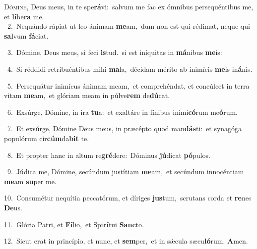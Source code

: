 \lettrine{\initial\textcolor{\initialcolor}{D}}{ómine,} Deus meus, in te spe\-\textbf{rá}\-vi:~\star salvum me fac ex ómnibus persequéntibus me, et \textbf{lí}\-be\textbf{ra} me.\\
{\numbfont\textcolor{\numbcolor}{~2.}}~Nequándo rápiat ut leo ánimam \textbf{me}\-am,~\star dum non est qui rédimat, neque qui \textbf{sal}\-vum \textbf{fá}\-ciat.\par
{\numbfont\textcolor{\numbcolor}{~3.}}~Dómine, Deus meus, si feci \textbf{is}\-tud.~\star si est iníquitas in \textbf{má}\-nibus \textbf{me}\-is:\par
{\numbfont\textcolor{\numbcolor}{~4.}}~Si réddidi retribuéntibus mihi \textbf{ma}\-la,~\star décidam mérito ab inimícis \textbf{me}\-is in\-\textbf{á}\-nis.\par
{\numbfont\textcolor{\numbcolor}{~5.}}~Persequátur inimícus ánimam meam,~\dagger et comprehéndat, et concúlcet in terra vitam \textbf{me}\-am,~\star et glóriam meam in púlve\textbf{rem} de\-\textbf{dú}\-cat.\par
{\numbfont\textcolor{\numbcolor}{~6.}}~Exsúrge, Dómine, in ira \textbf{tu}\-a:~\star et exaltáre in fínibus inimi\-\textbf{có}\-rum me\-\textbf{ó}\-rum.\par
{\numbfont\textcolor{\numbcolor}{~7.}}~Et exsúrge, Dómine Deus meus, in præcépto quod man\-\textbf{dás}\-ti:~\star et synagóga populórum cir\-\textbf{cúm}\-da\textbf{bit} te.\par
{\numbfont\textcolor{\numbcolor}{~8.}}~Et propter hanc in altum re\-\textbf{gré}\-dere:~\star Dóminus \textbf{jú}\-dicat \textbf{pó}\-pulos.\par
{\numbfont\textcolor{\numbcolor}{~9.}}~Júdica me, Dómine, secúndum justítiam \textbf{me}\-am,~\star et secúndum innocéntiam \textbf{me}\-am \textbf{su}\-per me.\par
{\numbfont\textcolor{\numbcolor}{10.}}~Consumétur nequítia peccatórum, et díriges \textbf{jus}\-tum,~\star scrutans corda et \textbf{re}\-nes \textbf{De}\-us.\par
{\numbfont\textcolor{\numbcolor}{11.}}~Glória Patri, et \textbf{Fí}\-lio,~\star et Spi\-\textbf{rí}\-tui \textbf{Sanc}\-to.\par
{\numbfont\textcolor{\numbcolor}{12.}}~Sicut erat in princípio, et nunc, et \textbf{sem}\-per,~\star et in sǽcula sæcu\-\textbf{ló}\-rum. \textbf{A}\-men.\par
